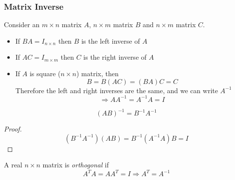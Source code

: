\documentclass{article}
\numberwithin{equation}{section}
\begin{document}
\subsubsection{Matrix Inverse}
Consider an $m \times n$ matrix $A$, $n \times m$ matrix $B$ and $n \times m$ matrix $C$.
\begin{itemize}
    \item If $BA = I_{n \times n}$ then $B$ is the left inverse of $A$
    \item If $AC = I_{m \times m}$ then $C$ is the right inverse of $A$
    \item If $A$ is square ($n \times n$) matrix, then
    \[
        B = B(AC) = (BA)C = C  
    \]
    Therefore the left and right inverses are the same, and we can write $A^{-1}$
    \begin{equation}\label{eq:3-19}
        \Rightarrow AA^{-1} = A^{-1}A = I
    \end{equation}
\end{itemize}
\begin{remark}
    \begin{equation}\label{eq:3-20}
        (AB)^{-1} = B^{-1}A^{-1}
    \end{equation}
    \begin{proof}
        \[
            (B^{-1}A^{-1})(AB) = B^{-1}(A^{-1}A)B = I
        \]
    \end{proof}
\end{remark}

\begin{defi}[Orthogonal]
    A real $n \times n$ matrix is \emph{orthogonal} if
    \[
        A^TA = AA^T = I \Rightarrow A^T = A^{-1}  
    \]
\end{defi}
\end{document}
